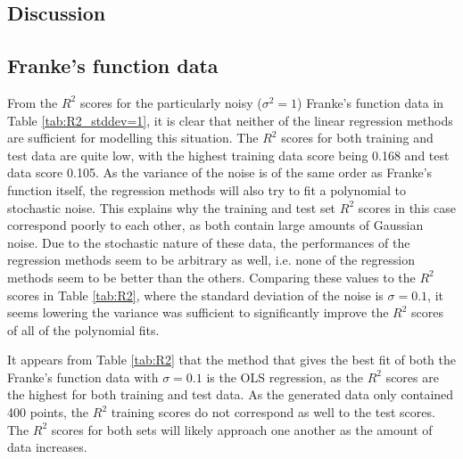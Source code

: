 \documentclass[a4paper, 10pt]{article}
\begin{document}
\begin{multicols}{2}


\section{Discussion}
\subsection{Franke's function data}
From the $R^2$ scores for the particularly noisy ($\sigma^2 = 1$) Franke's function data in Table \ref{tab:R2_stddev=1}, it is clear that neither of the linear regression methods are sufficient for modelling this situation. The $R^2$ scores for both training and test data are quite low, with the highest training data score being 0.168 and test data score 0.105. As the variance of the noise is of the same order as Franke's function itself, the regression methods will also try to fit a polynomial to stochastic noise. This explains why the training and test set $R^2$ scores in this case correspond poorly to each other, as both contain large amounts of Gaussian noise. Due to the stochastic nature of these data, the performances of the regression methods seem to be arbitrary as well, i.e. none of the regression methods seem to be better than the others. Comparing these values to the $R^2$ scores in Table \ref{tab:R2}, where the standard deviation of the noise is $\sigma=0.1$, it seems lowering the variance was sufficient to significantly improve the $R^2$ scores of all of the polynomial fits.

It appears from Table \ref{tab:R2} that the method that gives the best fit of both the Franke's function data with $\sigma=0.1$ is the OLS regression, as the $R^2$ scores are the highest for both training and test data. As the generated data only contained 400 points, the $R^2$ training scores do not correspond as well to the test scores. The $R^2$ scores for both sets will likely approach one another as the amount of data increases.


\end{multicols}
\end{document}
